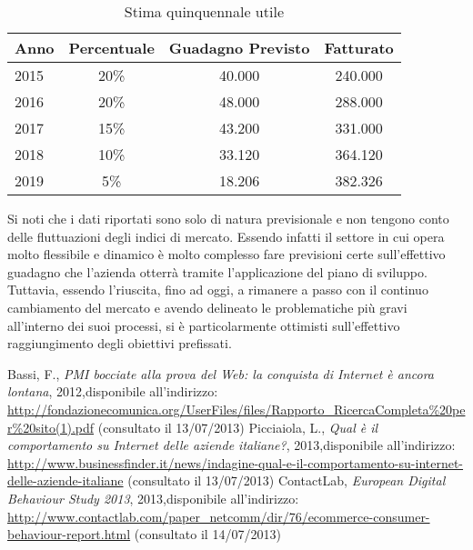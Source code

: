 \begin{table}[H]
\centering
\begin{tabular}{|p{}|c|c|c|}
\hline 

\textbf{ Anno} &  \textbf{Percentuale} &\textbf{Guadagno Previsto}& \textbf{Fatturato}\\
\hline
 2015 & 20\% & \text{\euro} 40.000 &\text{\euro} 240.000 \\
 2016 & 20\% & \text{\euro} 48.000 & \text{\euro} 288.000 \\
 2017 & 15\% & \text{\euro} 43.200 & \text{\euro} 331.000\\
 2018 & 10\% & \text{\euro} 33.120 & \text{\euro} 364.120\\
 2019 & 5\% & \text{\euro} 18.206 &  \text{\euro} 382.326\\
\hline

\end{tabular}
\caption{Stima quinquennale utile }\label{tab:utile}
\end{table}


Si noti che i dati riportati sono solo di natura previsionale e non tengono conto delle fluttuazioni degli indici di mercato. Essendo infatti il settore in cui opera \customer molto flessibile e dinamico è molto complesso fare previsioni certe sull'effettivo guadagno che l'azienda otterrà tramite l'applicazione del piano di sviluppo. Tuttavia, essendo l'\customer riuscita, fino ad oggi, a rimanere a passo con il continuo cambiamento del mercato e avendo delineato le problematiche più gravi all'interno dei suoi processi, si è particolarmente ottimisti sull'effettivo raggiungimento degli obiettivi prefissati.








\begin{thebibliography}{9}
   Bassi, F., \textit{PMI bocciate alla prova del Web: la conquista di Internet è ancora lontana}, 2012,\newline disponibile all'indirizzo: \url{http://fondazionecomunica.org/UserFiles/files/Rapporto_RicercaCompleta%20per%20sito(1).pdf} (consultato il 13/07/2013)
   Picciaiola, L., \textit{Qual è il comportamento su Internet delle aziende italiane?}, 2013,\newline disponibile all'indirizzo: \url{http://www.businessfinder.it/news/indagine-qual-e-il-comportamento-su-internet-delle-aziende-italiane} (consultato il 13/07/2013)
   ContactLab, \textit{European Digital Behaviour Study 2013}, 2013,\newline disponibile all'indirizzo: \url{http://www.contactlab.com/paper_netcomm/dir/76/ecommerce-consumer-behaviour-report.html} (consultato il 14/07/2013)
\end{thebibliography}


